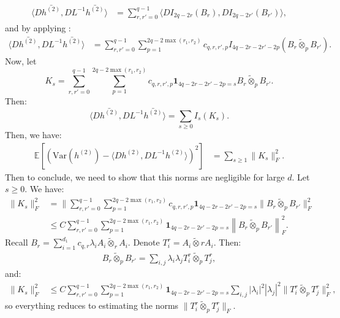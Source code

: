 \documentclass[]{article}
\makeatletter
\numberwithin{equation}{section}
\theoremstyle{definition}
\renewenvironment{proof}[1][\proofname]{\par
  \pushQED{\qed}%
  \normalfont \topsep6\p@\@plus6\p@\relax
  \trivlist
  \item[\hskip\labelsep\textbf{#1.}]\ignorespaces
}{%
  \popQED\endtrivlist\@endpefalse
}
\newcommand{\EE}{\mathbb{E}}
\makeatother
\begin{document}
\begin{proof}
\begin{align}
    \langle D\bar{h^{(2)}}, DL^{-1}\bar{h^{(2)}}\rangle & = \sum_{r,r'= 0}^{q-1}\langle D I_{2q-2r}(B_{r}), DI_{2q-2r'}(B_{r'}) \rangle, 
\end{align}
and by applying : 
\begin{align}
     \langle D\bar{h^{(2)}}, DL^{-1}\bar{h^{(2)}}\rangle & = \sum_{r,r'= 0}^{q-1} \sum_{p=1}^{2q-2\max(r_1, r_2)}c_{q,r,r',p}I_{4q-2r-2r'-2p}(B_{r} \tilde{\otimes}_{p} B_{r'}). 
\end{align}
Now, let 
\begin{equation}
    K_{s} = \sum_{r,r'= 0}^{q-1} \sum_{p=1}^{2q-2\max(r_1, r_2)}c_{q,r,r',p} \mathbf{1}_{4q-2r-2r'-2p = s} B_{r} \tilde{\otimes}_{p} B_{r'}. 
\end{equation}
Then: 
\begin{equation}
    \langle D\bar{h^{(2)}}, DL^{-1}\bar{h^{(2)}}\rangle = \sum_{s \geq 0} I_{s} (K_{s}).
\end{equation}
Then, we have: 
\begin{align}
    \EE \left[ \left (\mathrm{Var}(h^{(2)}) - \langle Dh^{(2)}, DL^{-1}h^{(2)}\rangle \right )^{2}\right ] & = \sum_{s \geq 1} \|K_{s}\|^{2}_{F}. 
\end{align}
Then to conclude, we need to show that this norms are negligible for large $d$. Let $s \geq 0$. We have: 
\begin{align}
    \| K_{s}\|_F^{2} &= \|  \sum_{r,r'= 0}^{q-1} \sum_{p=1}^{2q-2\max(r_1, r_2)}c_{q,r,r',p} \mathbf{1}_{4q-2r-2r'-2p = s} \|B_{r} \tilde{\otimes}_{p} B_{r'} \|_F^{2} \\
    & \leq C \sum_{r,r'= 0}^{q-1} \sum_{p=1}^{2q-2\max(r_1, r_2)}\mathbf{1}_{4q-2r-2r'-2p = s} \left \|B_{r} \tilde{\otimes}_{p} B_{r'} \right \|_F^{2}.
\end{align}
Recall $B_{r} = \sum_{i=1}^{d_1} c_{q,r}\lambda_i A_i \tilde{\otimes}_{r}A_i$. Denote $T^r_{i} = A_i \tilde{\otimes}{r}A_i$. Then: 
\begin{align}
    B_{r} \tilde{\otimes}_{p} B_{r'} = \sum_{i,j} \lambda_i \lambda_j T^r_i \tilde{\otimes}_{p} T^{r}_j,
\end{align}
and: 
\begin{align}
    \| K_{s}\|_{F}^{2} & \leq C \sum_{r,r'= 0}^{q-1} \sum_{p=1}^{2q-2\max(r_1, r_2)}\mathbf{1}_{4q-2r-2r'-2p = s} \sum_{i,j} |\lambda_i|^2 |\lambda_j|^2 \|T^r_i \tilde{\otimes}_{p} T^{r}_j\|_{F}^2,
    \label{eq:bound_frobenius_K_s}
\end{align}
so everything reduces to estimating the norms $\|T^r_i \tilde{\otimes}_{p} T^{r}_j\|_{F}$. 


\end{proof}
\end{document}

